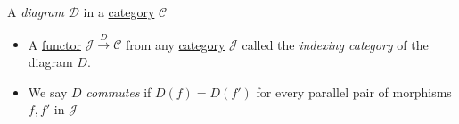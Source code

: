 A \emph{diagram} $\mathcal{D}$ in a \hyperref[D3.6]{category} $\mathcal{C}$

\begin{itemize}
    \item  A \hyperref[D3.35]{functor} $\mathcal{J}\xrightarrow{D}\mathcal{C}$ from any \hyperref[D3.6]{category} $\mathcal{J}$ called the \emph{indexing category} of the diagram $D$.
    \item We say $D$ \emph{commutes} if $D(f)=D(f')$ for every parallel pair of morphisms $f,f'$ in $\mathcal{J}$

  \end{itemize}
